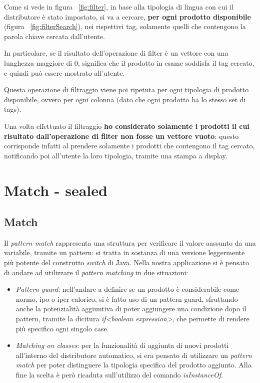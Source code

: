 Come si vede in figura ~\ref{fig:filter}, in base alla tipologia di lingua con cui il distributore è stato impostato, si va a cercare, \textbf{per ogni prodotto disponibile} (figura ~\ref{fig:filterSearch}), nei rispettivi tag, solamente quelli che contengono la parola chiave cercata dall'utente.

In particolare, se il risultato dell'operazione di filter è un vettore con una lunghezza maggiore di 0, significa che il prodotto in esame soddisfa il tag cercato, e quindi può essere mostrato all'utente. 

Questa operazione di filtraggio viene poi ripetuta per ogni tipologia di prodotto disponibile, ovvero per ogni colonna (dato che ogni prodotto ha lo stesso set di tags).

Una volta effettuato il filtraggio \textbf{ho considerato solamente i prodotti il cui risultato dall'operazione di filter non fosse un vettore vuoto}: questo corrisponde infatti al prendere solamente i prodotti che contengono il tag cercato, notificando poi all'utente la loro tipologia, tramite una stampa a display.

\section{Match - sealed}
\label{sec:match_sealed}
\subsection{Match}
Il \textit{pattern match} rappresenta una struttura per verificare il valore aassunto da una variabile, tramite un pattern: si tratta in sostanza di una versione leggermente più potente del construtto \textit{switch} di Java.
Nella nostra applicazione si è pensato di andare ad utilizzare il \textit{pattern matching} in due situazioni:
\begin{itemize}
	\item \textit{Pattern guard}: nell'andare a definire se un prodotto è considerabile come normo, ipo o iper calorico, si è fatto uso di un pattern guard, sfruttando anche la potenzialità aggiuntiva di poter aggiungere una condizione dopo il pattern, tramite la dicitura \textit{if<boolean expression>}, che permette di rendere più specifico ogni singolo case.
	\item \textit{Matching on classes}: per la funzionalità di aggiunta di nuovi prodotti all'interno del distributore automatico, si era pensato di utilizzare un \textit{pattern match} per poter distinguere la tipologia specifica del prodotto aggiunto. Alla fine la scelta è però ricaduta sull'utilizzo del comando \textit{isInstanceOf}.
\end{itemize}
